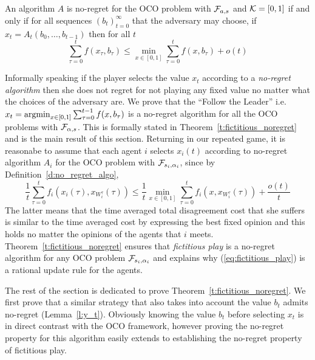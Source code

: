 \begin{definition}\label{d:no_regret_algo}
An algorithm $A$ is no-regret for the OCO problem with $\mathcal{F}_{a,s}$ and
$\mathcal{K}=[0,1]$ if and only if for all sequences $(b_t)_{t=0}^\infty$ that the
adversary may choose, if $x_t = A_t(b_0,\dots,b_{t-1})$ then for all $t$
\[\sum_{\tau=0}^t f(x_\tau,b_\tau)  \leq \min_{x \in [0,1]}\sum_{\tau=0}^t f(x,b_\tau) + o(t) \]
\end{definition}
Informally speaking if the player selects the value 
$x_t$ according to a \emph{no-regret algorithm} then
she does not regret for not playing any fixed value no
matter what the choices of the adversary are.
We prove that the \enquote{Follow the Leader} i.e. 
$x_t = \operatorname*{argmin}_{x \in [0,1]}\sum_{\tau=0}^{t-1}f(x,b_\tau)$
is a no-regret algorithm for all the OCO problems with $\mathcal{F}_{\alpha,s}$.
This is formally stated in Theorem~\ref{t:fictitious_noregret} 
and is the main result of this section.
Returning in our repeated game, it is reasonabe to 
assume that each agent $i$ selects $x_i(t)$ according
to no-regret algorithm $A_i$ for the OCO problem with $\mathcal{F}_{s_i,\alpha_i}$,
since by Definition~\ref{d:no_regret_algo},
\[\frac{1}{t}\sum_{\tau=0}^t f_i(x_i(\tau),x_{W_i^\tau}(\tau)) \leq
\frac{1}{t}\min_{x \in [0,1]}\sum_{\tau=0}^tf_i(x,x_{W_i^\tau}(\tau)) + \frac{o(t)}{t}\]
The latter means that the time averaged total disagreement cost
that she suffers is similar to the time averaged cost by expressing the 
best fixed opinion and this holds no matter the opinions of the
agents that $i$ meets. Theorem~\ref{t:fictitious_noregret}
ensures that \emph{fictitious play} is a no-regret algorithm 
for any OCO problem $\mathcal{F}_{s_i,\alpha_i}$ and explains why 
(\ref{eq:fictitious_play}) is a rational update rule for the agents. 

The rest of the section is dedicated to prove Theorem~\ref{t:fictitious_noregret}. 
We first prove that a similar strategy that also takes into
account the value $b_t$ admits no-regret (Lemma~\ref{l:y_t}). 
Obviously knowing the value $b_t$ before selecting $x_t$ 
is in direct contrast with the OCO framework, however proving 
the no-regret property for this algorithm easily extends to 
establishing the no-regret property of fictitious play.

